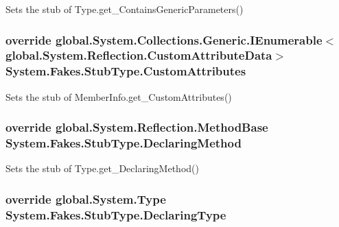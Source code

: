 Sets the stub of Type.\-get\-\_\-\-Contains\-Generic\-Parameters()

\hypertarget{class_system_1_1_fakes_1_1_stub_type_a6d43df5fd9436e2775406b1de6d0ae85}{
\subsubsection[{Custom\-Attributes}]{\setlength{\rightskip}{0pt plus 5cm}override global.\-System.\-Collections.\-Generic.\-I\-Enumerable$<$global.\-System.\-Reflection.\-Custom\-Attribute\-Data$>$ System.\-Fakes.\-Stub\-Type.\-Custom\-Attributes\hspace{0.3cm}{\ttfamily [get]}}}\label{class_system_1_1_fakes_1_1_stub_type_a6d43df5fd9436e2775406b1de6d0ae85}


Sets the stub of Member\-Info.\-get\-\_\-\-Custom\-Attributes()

\hypertarget{class_system_1_1_fakes_1_1_stub_type_a44afe3835f68393983565d5a072ff32a}{
\subsubsection[{Declaring\-Method}]{\setlength{\rightskip}{0pt plus 5cm}override global.\-System.\-Reflection.\-Method\-Base System.\-Fakes.\-Stub\-Type.\-Declaring\-Method\hspace{0.3cm}{\ttfamily [get]}}}\label{class_system_1_1_fakes_1_1_stub_type_a44afe3835f68393983565d5a072ff32a}


Sets the stub of Type.\-get\-\_\-\-Declaring\-Method()

\hypertarget{class_system_1_1_fakes_1_1_stub_type_af8cd38b597af64afef9e43ea4c78e613}{
\subsubsection[{Declaring\-Type}]{\setlength{\rightskip}{0pt plus 5cm}override global.\-System.\-Type System.\-Fakes.\-Stub\-Type.\-Declaring\-Type\hspace{0.3cm}{\ttfamily [get]}}}\label{class_system_1_1_fakes_1_1_stub_type_af8cd38b597af64afef9e43ea4c78e613}


